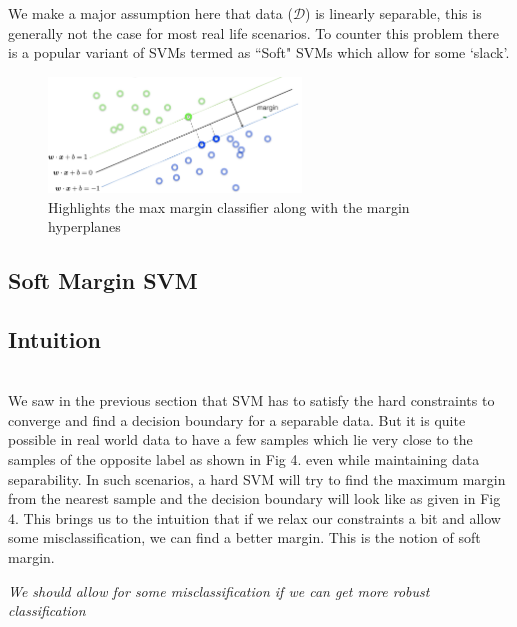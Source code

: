 \documentclass[11pt]{article}
\begin{document}
We make a major assumption here that data ($\mathcal{D}$) is linearly separable, this is generally not the case for most real life scenarios. To counter this problem there is a popular variant of SVMs termed as ``Soft" SVMs which allow for some `slack'.
\begin{figure}[!t]
    \centering
    \includegraphics[width=0.6\textwidth]{images/Best Margin.png}
    \caption{Highlights the max margin classifier along with the margin hyperplanes}
    \label{fig:3}
\end{figure}

\subsection{Soft Margin SVM}

\subsection*{{\textbf{Intuition}}}\\
We saw in the previous section that SVM has to satisfy the hard constraints to converge and find a decision boundary for a separable data. But it is quite possible in real world data to have a few samples which lie very close to the samples of the opposite label as shown in Fig 4. even while maintaining data separability. In such scenarios, a hard SVM will try to find the maximum margin from the nearest sample and the decision boundary will look like as given in Fig 4. This brings us to the intuition that if we relax our constraints a bit and allow some misclassification, we can find a better margin. This is the notion of soft margin. 
\begin{center}
    \textit{We should allow for some misclassification if we can get more robust classification}
\end{center}
\end{document}
